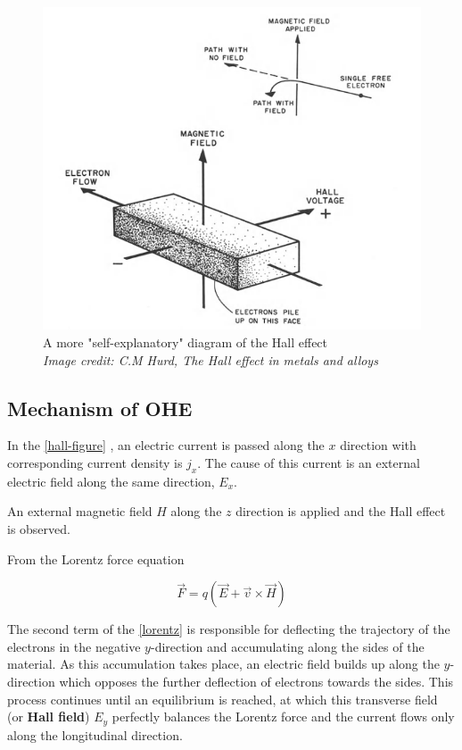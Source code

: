\begin{figure}[h!]
    \includegraphics[width=\columnwidth]{hall-effect-hurd.png}
    \caption{A more "self-explanatory" diagram of the Hall effect\\ \textit{Image credit: C.M Hurd, The Hall effect in metals and alloys}}
\end{figure}

\subsection{Mechanism of OHE}

In the \cref{hall-figure} , an electric current is passed along the $ x $ direction with corresponding current density is $ j_x $.
The cause of this current is an external electric field along the same direction, $ E_x $.

An external magnetic field $ H $ along the $ z $ direction is applied and the Hall effect is observed.

From the Lorentz force equation

\begin{equation} \label{lorentz}
    \vec{F} = q (\vec{E} + \vec{v} \times \vec{H})
\end{equation}

The second term of the \cref{lorentz} is responsible for deflecting the trajectory of the electrons in the negative $ y $-direction and accumulating along the sides of the material.
As this accumulation takes place, an electric field builds up along the $ y $-direction which opposes the further deflection of electrons towards the sides.
This process continues until an equilibrium is reached, at which this transverse field (or \textbf{Hall field}) $ E_y $ perfectly balances the Lorentz force and the current flows only along the longitudinal direction.

